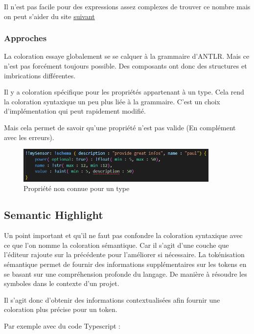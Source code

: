 \documentclass[
    iict, %
    il, %
]{heig-tb}
\begin{document}
Il n'est pas facile pour des expressions assez complexes de trouver ce nombre mais on peut s'aider du site \href{https://regex101.com/}{suivant}

\subsubsection{Approches}
La coloration essaye globalement se se calquer à la grammaire d'ANTLR. Mais ce n'est pas forcément toujours possible.
Des composants ont donc des structures et imbrications différentes.

Il y a coloration spécifique pour les propriétés appartenant à un type.
Cela rend la coloration syntaxique un peu plus liée à la grammaire.
C'est un choix d'implémentation qui peut rapidement modifié.

Mais cela permet de savoir qu'une propriété n'est pas valide (En complément avec les erreurs).

\begin{figure}[!h]
    \begin{center}
        \includegraphics[width=10cm]{assets/figures/uon-unkown-type.PNG}
    \end{center}
    \caption[Propriété non connue pour un type]{\label{example-uon-coloration} Propriété non connue pour un type}
\end{figure}


\subsection{Semantic Highlight}

Un point important et qu'il ne faut pas confondre la coloration syntaxique avec ce que l'on nomme la coloration sémantique. Car il s'agit d'une couche que l'éditeur rajoute sur la précédente pour l'améliorer si nécessaire.
La tokénisation sémantique permet de fournir des informations supplémentaires sur les tokens en se basant sur une compréhension profonde du langage.
De manière à résoudre les symboles dans le contexte d'un projet.

Il s'agit donc d'obtenir des informations contextualisées afin fournir une coloration plus précise pour un token.

Par exemple avec du code Typescript :
\end{document}
